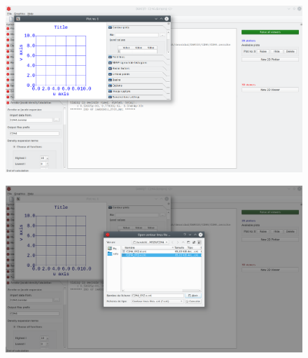\documentclass[a4paper,10pt]{article}
\begin{document}
\begin{minipage}{.5\linewidth}
\begin{figure}[H]
\caption{\label{fig:23}}
\begin{center}
\includegraphics[width=0.95\linewidth]{damqt_QS_fig23.png}
\end{center}
\end{figure} 
\end{minipage}
\begin{minipage}{.5\linewidth}
\begin{figure}[H]
\caption{\label{fig:24}}
\begin{center}
\includegraphics[width=0.95\linewidth]{damqt_QS_fig24.png}
\end{center}
\end{figure} 
\end{minipage}
\end{document}
